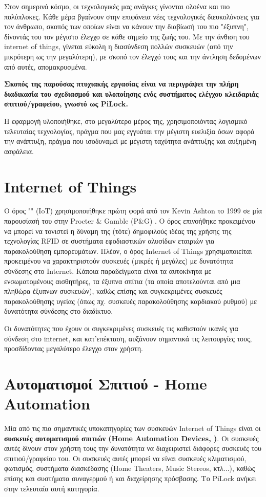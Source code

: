 Στον σημερινό κόσμο, οι τεχνολογικές μας ανάγκες γίνονται ολοένα και πιο πολύπλοκες. Κάθε μέρα βγαίνουν στην επιφάνεια νέες τεχνολογικές διευκολύνσεις για τον άνθρωπο, σκοπός των οποίων είναι να κάνουν την διαβίωσή του πιο "έξυπνη", δίνοντάς του τον μέγιστο έλεγχο σε κάθε σημείο της ζωής του. Με την άνθιση του internet of things, γίνεται εύκολη η διασύνδεση πολλών συσκευών (από την μικρότερη ως την μεγαλύτερη), με σκοπό τον έλεγχό τους και την άντληση δεδομένων από αυτές, απομακρυσμένα.

\textbf{Σκοπός της παρούσας πτυχιακής εργασίας είναι να περιγράψει την πλήρη διαδικασία του σχεδιασμού και υλοποίησης ενός συστήματος ελέγχου κλειδαριάς σπιτιού/γραφείου, γνωστό ως PiLock.}

Η εφαρμογή υλοποιήθηκε, στο μεγαλύτερο μέρος της, χρησιμοποιόντας λογισμικό τελευταίας τεχνολογίας, πράγμα που μας εγγυάται την μέγιστη ευελιξία όσων αφορά την ανάπτυξη, πράγμα που ισοδυναμεί με μέγιστη ταχύτητα ανάπτυξης και αυξημένη ασφάλεια. %

\section{Internet of Things}
	Ο όρος "" (IoT) χρησιμοποιήθηκε πρώτη φορά από τον Kevin Ashton το 1999 σε μία παρουσίασή του στην Procter \& Gamble (P\&G) \cite{iotterm}. Ο όρος επινοήθηκε προκειμένου να μπορεί να τονιστεί η δύναμη της (τότε) δημοφιλούς ιδέας της χρήσης της τεχνολογίας RFID σε συστήματα εφοδιαστικών αλυσίδων εταιριών για παρακολούθηση εμπορευμάτων. Πλέον, ο όρος Internet of Things χρησιμοποιείται προκειμένου να χαρακτηριστούν συσκευές (μικρές ή μεγάλες) με δυνατότητα σύνδεσης στο Internet. Κάποια παραδείγματα είναι τα αυτοκίνητα με ενσωματομένους αισθητήρες, τα έξυπνα σπίτια (τα οποία αποτελούνται από μια πληθώρα έξυπνων συσκευών), καθώς επίσης και συγκεκριμένες συσκευές παρακολούθησης υγείας (όπως πχ. συσκευές παρακολούθησης καρδιακού ρυθμού) με δυνατότητα σύνδεσης στο διαδίκτυο.

	Οι δυνατότητες που έχουν οι συγκεκριμένες συσκευές τις καθιστούν ικανές για σύνδεση στο internet, και κατ'επέκταση, αυξάνουν σημαντικά τις λειτουργίες τους, προσδίδοντας μεγαλύτερο έλεγχο στον χρήστη. %

\section{Αυτοματισμοί Σπιτιού - Home Automation}
	Μία από τις πιο σημαντικές υποκατηγορίες των συσκευών Internet of Things είναι οι \textbf{συσκευές αυτοματισμού σπιτιών (Home Automation Devices,  \cite{domotics} )}. Οι συσκευές αυτές δίνουν στον χρήστη τους την δυνατότητα να διαχειριστεί διάφορες συσκευές του σπιτιού/γραφείου του. Οι συσκευές αυτές μπορεί να είναι συσκευές κλιματισμού, φωτισμός, συστήματα διασκέδασης (Home Theaters, Music Stereos, κτλ...), καθώς επίσης και συστήματα συναγερμού ή και διαχείρησης πρόσβασης. Το PiLock ανήκει στην τελευταία αυτή κατηγορία.

